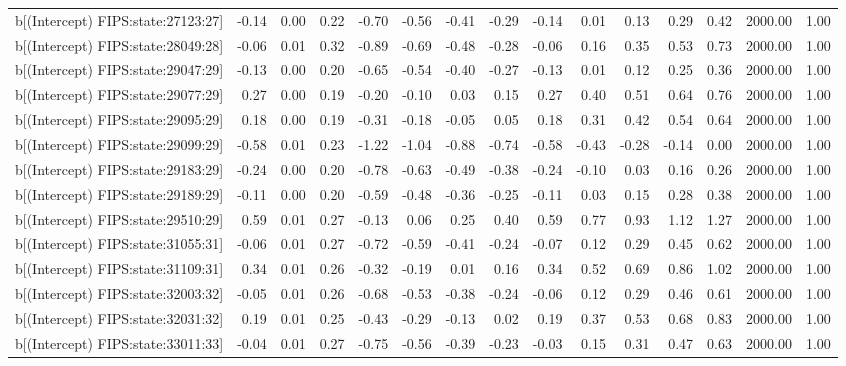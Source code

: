 \begin{table}[ht]
\begin{tabular}{rrrrrrrrrrrrrrr}
  b[(Intercept) FIPS:state:27123:27] & -0.14 & 0.00 & 0.22 & -0.70 & -0.56 & -0.41 & -0.29 & -0.14 & 0.01 & 0.13 & 0.29 & 0.42 & 2000.00 & 1.00 \\ 
  b[(Intercept) FIPS:state:28049:28] & -0.06 & 0.01 & 0.32 & -0.89 & -0.69 & -0.48 & -0.28 & -0.06 & 0.16 & 0.35 & 0.53 & 0.73 & 2000.00 & 1.00 \\ 
  b[(Intercept) FIPS:state:29047:29] & -0.13 & 0.00 & 0.20 & -0.65 & -0.54 & -0.40 & -0.27 & -0.13 & 0.01 & 0.12 & 0.25 & 0.36 & 2000.00 & 1.00 \\ 
  b[(Intercept) FIPS:state:29077:29] & 0.27 & 0.00 & 0.19 & -0.20 & -0.10 & 0.03 & 0.15 & 0.27 & 0.40 & 0.51 & 0.64 & 0.76 & 2000.00 & 1.00 \\ 
  b[(Intercept) FIPS:state:29095:29] & 0.18 & 0.00 & 0.19 & -0.31 & -0.18 & -0.05 & 0.05 & 0.18 & 0.31 & 0.42 & 0.54 & 0.64 & 2000.00 & 1.00 \\ 
  b[(Intercept) FIPS:state:29099:29] & -0.58 & 0.01 & 0.23 & -1.22 & -1.04 & -0.88 & -0.74 & -0.58 & -0.43 & -0.28 & -0.14 & 0.00 & 2000.00 & 1.00 \\ 
  b[(Intercept) FIPS:state:29183:29] & -0.24 & 0.00 & 0.20 & -0.78 & -0.63 & -0.49 & -0.38 & -0.24 & -0.10 & 0.03 & 0.16 & 0.26 & 2000.00 & 1.00 \\ 
  b[(Intercept) FIPS:state:29189:29] & -0.11 & 0.00 & 0.20 & -0.59 & -0.48 & -0.36 & -0.25 & -0.11 & 0.03 & 0.15 & 0.28 & 0.38 & 2000.00 & 1.00 \\ 
  b[(Intercept) FIPS:state:29510:29] & 0.59 & 0.01 & 0.27 & -0.13 & 0.06 & 0.25 & 0.40 & 0.59 & 0.77 & 0.93 & 1.12 & 1.27 & 2000.00 & 1.00 \\ 
  b[(Intercept) FIPS:state:31055:31] & -0.06 & 0.01 & 0.27 & -0.72 & -0.59 & -0.41 & -0.24 & -0.07 & 0.12 & 0.29 & 0.45 & 0.62 & 2000.00 & 1.00 \\ 
  b[(Intercept) FIPS:state:31109:31] & 0.34 & 0.01 & 0.26 & -0.32 & -0.19 & 0.01 & 0.16 & 0.34 & 0.52 & 0.69 & 0.86 & 1.02 & 2000.00 & 1.00 \\ 
  b[(Intercept) FIPS:state:32003:32] & -0.05 & 0.01 & 0.26 & -0.68 & -0.53 & -0.38 & -0.24 & -0.06 & 0.12 & 0.29 & 0.46 & 0.61 & 2000.00 & 1.00 \\ 
  b[(Intercept) FIPS:state:32031:32] & 0.19 & 0.01 & 0.25 & -0.43 & -0.29 & -0.13 & 0.02 & 0.19 & 0.37 & 0.53 & 0.68 & 0.83 & 2000.00 & 1.00 \\ 
  b[(Intercept) FIPS:state:33011:33] & -0.04 & 0.01 & 0.27 & -0.75 & -0.56 & -0.39 & -0.23 & -0.03 & 0.15 & 0.31 & 0.47 & 0.63 & 2000.00 & 1.00 \\ 

\end{tabular}
\end{table}
